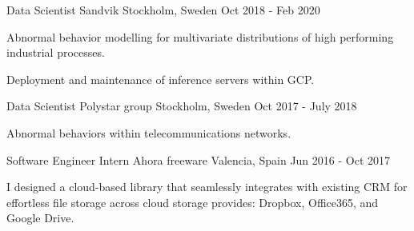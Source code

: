 \begin{cventries}
\cventry
    {Data Scientist}
    {Sandvik}
    {Stockholm, Sweden}
    {Oct 2018 - Feb 2020}
    {
        \begin{cvitems}
            \item {Abnormal behavior modelling for multivariate distributions of high performing industrial processes.}
            \item {Deployment and maintenance of inference servers within GCP.}
        \end{cvitems}
    }

\cventry
    {Data Scientist}
    {Polystar group}
    {Stockholm, Sweden}
    {Oct 2017 - July 2018}
    {
        \begin{cvitems}
            \item {Abnormal behaviors within telecommunications networks.}
        \end{cvitems}
    }

\cventry
    {Software Engineer Intern}
    {Ahora freeware}
    {Valencia, Spain}
    {Jun 2016 - Oct 2017}
    {
        \begin{cvitems}
            \item {I designed a cloud-based library that seamlessly integrates with existing CRM for effortless file storage across cloud storage provides: Dropbox, Office365, and Google Drive.}
        \end{cvitems}
    }   

\end{cventries}

